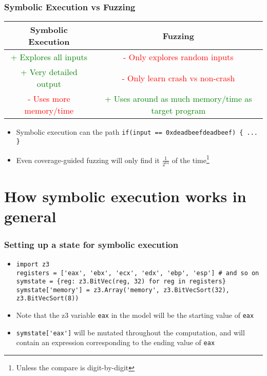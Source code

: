 \documentclass[aspectratio=169]{beamer}
\begin{document}
\begin{frame}[fragile]
\frametitle{Symbolic Execution vs Fuzzing}
\begin{tabular}{c|c}
Symbolic Execution & Fuzzing\\\hline
\textcolor{green}{+ Explores all inputs} & \textcolor{red}{- Only explores random inputs}\\
\textcolor{green}{+ Very detailed output} & \textcolor{red}{- Only learn crash vs non-crash}\\
\textcolor{red}{- Uses more memory/time} & \textcolor{green}{+ Uses around as much memory/time as target program}
\end{tabular}
\begin{itemize}
\item Symbolic execution can the path \verb|if(input == 0xdeadbeefdeadbeef) { ... }|
\item Even coverage-guided fuzzing will only find it $\frac{1}{2^{64}}$ of the time\footnote{Unless the compare is digit-by-digit}
\end{itemize}
\end{frame}

\section{How symbolic execution works in general}

\begin{frame}[fragile]
\frametitle{Setting up a state for symbolic execution}
\begin{itemize}
\item \begin{Verbatim}[fontsize=\scriptsize, frame=single]
import z3
registers = ['eax', 'ebx', 'ecx', 'edx', 'ebp', 'esp'] # and so on
symstate = {reg: z3.BitVec(reg, 32) for reg in registers}
symstate['memory'] = z3.Array('memory', z3.BitVecSort(32), z3.BitVecSort(8))
\end{Verbatim}
\item Note that the z3 variable \verb|eax| in the model will be the starting value of \verb|eax|
\item \verb|symstate['eax']| will be mutated throughout the computation, and will contain an expression corresponding to the ending value of \verb|eax|
\end{itemize}
\end{frame}
\end{document}
